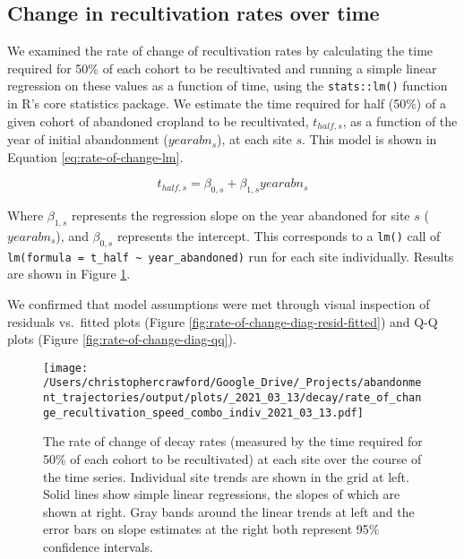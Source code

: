 \documentclass[9pt,twoside,lineno]{pnas-new}
\begin{document}
\newpage

\hypertarget{section-methods-rate-of-change}{%
\subsection{Change in recultivation rates over time}\label{section-methods-rate-of-change}}

We examined the rate of change of recultivation rates by calculating the time required for 50\% of each cohort to be recultivated and running a simple linear regression on these values as a function of time, using the \texttt{stats::lm()} function in R's core statistics package.
We estimate the time required for half (50\%) of a given cohort of abandoned cropland to be recultivated, \(t_{half,s}\), as a function of the year of initial abandonment (\(yearabn_{s}\)), at each site \(s\).
This model is shown in Equation \eqref{eq:rate-of-change-lm}.

\begin{equation}
t_{half,s} = \beta_{0,s} + \beta_{1,s} yearabn_{s} \label{eq:rate-of-change-lm}
\end{equation}

Where \(\beta_{1,s}\) represents the regression slope on the year abandoned for site \(s\) (\(yearabn_{s}\)), and \(\beta_{0,s}\) represents the intercept.
This corresponds to a \texttt{lm()} call of \texttt{lm(formula\ =\ t\_half\ \textasciitilde{}\ year\_abandoned)} run for each site individually.
Results are shown in Figure \ref{fig:decay-rate-of-change}.

We confirmed that model assumptions were met through visual inspection of residuals vs.~fitted plots (Figure \ref{fig:rate-of-change-diag-resid-fitted}) and Q-Q plots (Figure \ref{fig:rate-of-change-diag-qq}).



\begin{figure}
\centering
\texttt{[image: /Users/christophercrawford/Google\_Drive/\_Projects/abandonment\_trajectories/output/plots/\_2021\_03\_13/decay/rate\_of\_change\_recultivation\_speed\_combo\_indiv\_2021\_03\_13.pdf]}
\caption{\label{fig:decay-rate-of-change}The rate of change of decay rates (measured by the time required for 50\% of each cohort to be recultivated) at each site over the course of the time series. Individual site trends are shown in the grid at left. Solid lines show simple linear regressions, the slopes of which are shown at right. Gray bands around the linear trends at left and the error bars on slope estimates at the right both represent 95\% confidence intervals.}
\end{figure}
\end{document}
